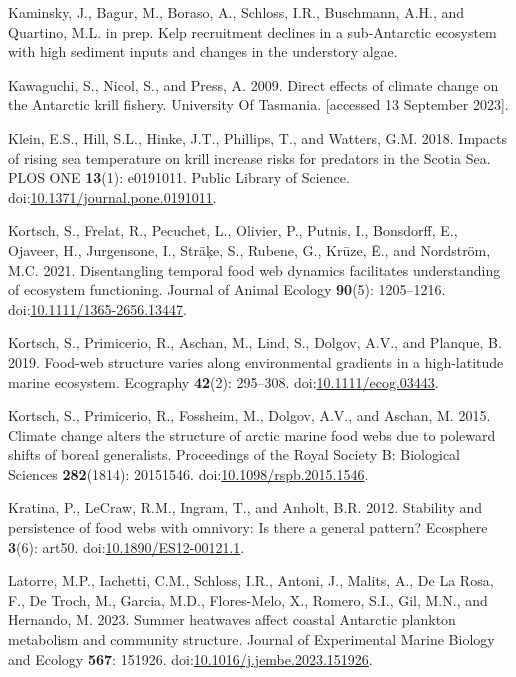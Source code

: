 \documentclass[
]{article}
\newlength{\cslhangindent}
\newenvironment{CSLReferences}[2] %
 {\begin{list}{}{%
  \setlength{\itemindent}{0pt}
  \setlength{\leftmargin}{0pt}
  \setlength{\parsep}{0pt}
  \ifodd #1
   \setlength{\leftmargin}{\cslhangindent}
   \setlength{\itemindent}{-1\cslhangindent}
  \fi
  \setlength{\itemsep}{#2\baselineskip}}}
 {\end{list}}
\begin{document}
\begin{CSLReferences}{1}{0}
Kaminsky, J., Bagur, M., Boraso, A., Schloss, I.R., Buschmann, A.H., and
Quartino, M.L. in prep. Kelp recruitment declines in a sub-{Antarctic}
ecosystem with high sediment inputs and changes in the understory algae.

Kawaguchi, S., Nicol, S., and Press, A. 2009. Direct effects of climate
change on the {Antarctic} krill fishery. University Of Tasmania.
{[}accessed 13 September 2023{]}.

Klein, E.S., Hill, S.L., Hinke, J.T., Phillips, T., and Watters, G.M.
2018. Impacts of rising sea temperature on krill increase risks for
predators in the {Scotia Sea}. PLOS ONE \textbf{13}(1): e0191011. Public
Library of Science.
doi:\href{https://doi.org/10.1371/journal.pone.0191011}{10.1371/journal.pone.0191011}.

Kortsch, S., Frelat, R., Pecuchet, L., Olivier, P., Putnis, I.,
Bonsdorff, E., Ojaveer, H., Jurgensone, I., Strāķe, S., Rubene, G.,
Krūze, Ē., and Nordström, M.C. 2021. Disentangling temporal food web
dynamics facilitates understanding of ecosystem functioning. Journal of
Animal Ecology \textbf{90}(5): 1205--1216.
doi:\href{https://doi.org/10.1111/1365-2656.13447}{10.1111/1365-2656.13447}.

Kortsch, S., Primicerio, R., Aschan, M., Lind, S., Dolgov, A.V., and
Planque, B. 2019. Food-web structure varies along environmental
gradients in a high-latitude marine ecosystem. Ecography \textbf{42}(2):
295--308.
doi:\href{https://doi.org/10.1111/ecog.03443}{10.1111/ecog.03443}.

Kortsch, S., Primicerio, R., Fossheim, M., Dolgov, A.V., and Aschan, M.
2015. Climate change alters the structure of arctic marine food webs due
to poleward shifts of boreal generalists. Proceedings of the Royal
Society B: Biological Sciences \textbf{282}(1814): 20151546.
doi:\href{https://doi.org/10.1098/rspb.2015.1546}{10.1098/rspb.2015.1546}.

Kratina, P., LeCraw, R.M., Ingram, T., and Anholt, B.R. 2012. Stability
and persistence of food webs with omnivory: {Is} there a general
pattern? Ecosphere \textbf{3}(6): art50.
doi:\href{https://doi.org/10.1890/ES12-00121.1}{10.1890/ES12-00121.1}.

Latorre, M.P., Iachetti, C.M., Schloss, I.R., Antoni, J., Malits, A., De
La Rosa, F., De Troch, M., Garcia, M.D., Flores-Melo, X., Romero, S.I.,
Gil, M.N., and Hernando, M. 2023. Summer heatwaves affect coastal
{Antarctic} plankton metabolism and community structure. Journal of
Experimental Marine Biology and Ecology \textbf{567}: 151926.
doi:\href{https://doi.org/10.1016/j.jembe.2023.151926}{10.1016/j.jembe.2023.151926}.


\end{CSLReferences}
\end{document}
